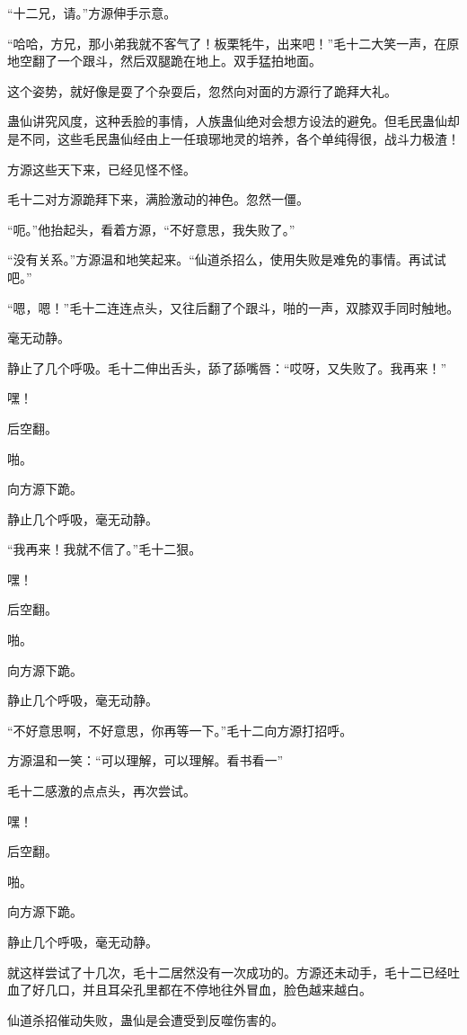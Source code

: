 \begin{this_body}
“十二兄，请。”方源伸手示意。

“哈哈，方兄，那小弟我就不客气了！板栗牦牛，出来吧！”毛十二大笑一声，在原地空翻了一个跟斗，然后双腿跪在地上。双手猛拍地面。

这个姿势，就好像是耍了个杂耍后，忽然向对面的方源行了跪拜大礼。

蛊仙讲究风度，这种丢脸的事情，人族蛊仙绝对会想方设法的避免。但毛民蛊仙却是不同，这些毛民蛊仙经由上一任琅琊地灵的培养，各个单纯得很，战斗力极渣！

方源这些天下来，已经见怪不怪。

毛十二对方源跪拜下来，满脸激动的神色。忽然一僵。

“呃。”他抬起头，看着方源，“不好意思，我失败了。”

“没有关系。”方源温和地笑起来。“仙道杀招么，使用失败是难免的事情。再试试吧。”

“嗯，嗯！”毛十二连连点头，又往后翻了个跟斗，啪的一声，双膝双手同时触地。

毫无动静。

静止了几个呼吸。毛十二伸出舌头，舔了舔嘴唇：“哎呀，又失败了。我再来！”

嘿！

后空翻。

啪。

向方源下跪。

静止几个呼吸，毫无动静。

“我再来！我就不信了。”毛十二狠。

嘿！

后空翻。

啪。

向方源下跪。

静止几个呼吸，毫无动静。

“不好意思啊，不好意思，你再等一下。”毛十二向方源打招呼。

方源温和一笑：“可以理解，可以理解。看书看一”

毛十二感激的点点头，再次尝试。

嘿！

后空翻。

啪。

向方源下跪。

静止几个呼吸，毫无动静。

就这样尝试了十几次，毛十二居然没有一次成功的。方源还未动手，毛十二已经吐血了好几口，并且耳朵孔里都在不停地往外冒血，脸色越来越白。

仙道杀招催动失败，蛊仙是会遭受到反噬伤害的。


\end{this_body}
